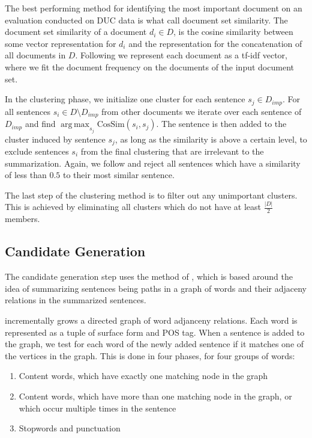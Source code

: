 \documentclass[a4paper,BCOR=10mm]{report}
\DeclareMathOperator*{\argmax}{arg\,max}
\begin{document}
The best performing method for identifying the most important document on an evaluation conducted on DUC data is what \citeauthor{banerjee} call document set similarity.
The document set similarity of a document $d_i \in D$, is the cosine similarity between some vector representation for $d_i$ and the representation for the concatenation of all documents in $D$.
Following \citeauthor{banerjee} we represent each document as a tf-idf vector, where we fit the document frequency on the documents of the input document set.

In the clustering phase, we initialize one cluster for each sentence $s_j \in D_{imp}$. For all sentences $s_i \in D \setminus D_{imp}$ from other documents we iterate over each sentence of $D_{imp}$ and find $\argmax_{s_j} \text{CosSim}(s_i, s_j)$. The sentence is then added to the cluster induced by sentence $s_j$, as long as the similarity is above a certain level, to exclude sentences $s_i$ from the final clustering that are irrelevant to the summarization.
Again, we follow \citeauthor{banerjee} and reject all sentences which have a similarity of less than $0.5$ to their most similar sentence.

The last step of the clustering method is to filter out any unimportant clusters. This is achieved by eliminating all clusters which do not have at least $\frac{|D|}{2}$ members.


\subsection{Candidate Generation} \label{sec:baseline-generation}

The candidate generation step uses the method of \citet{fillipova}, which is based around the idea of summarizing sentences being paths in a graph of words and their adjaceny relations in the summarized sentences.

\citeauthor{fillipova} incrementally grows a directed graph of word adjanceny relations. Each word is represented as a tuple of surface form and POS tag. When a sentence is added to the graph, we test for each word of the newly added sentence if it matches one of the vertices in the graph. This is done in four phases, for four groups of words:

\begin{enumerate}
\item{Content words, which have exactly one matching node in the graph}
\item{Content words, which have more than one matching node in the graph, or which occur multiple times in the sentence}
\item{Stopwords and punctuation} %
\end{enumerate}
\end{document}
